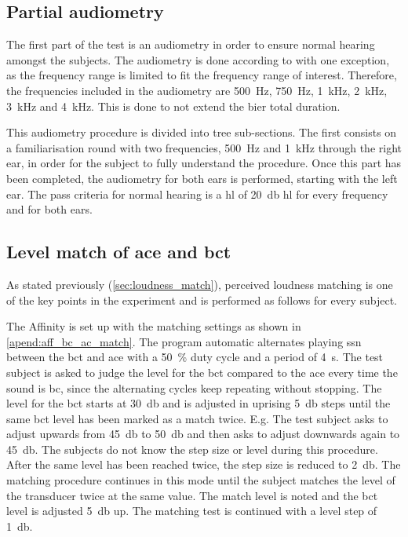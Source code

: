 \subsection{Partial audiometry}
The first part of the test is an audiometry in order to ensure normal hearing amongst the subjects. The audiometry is done according to \citep{iso_8253-2} with one exception, as the frequency range is limited to fit the frequency range of interest. Therefore, the frequencies included in the audiometry are \SI{500}{\hertz}, \SI{750}{\hertz}, \SI{1}{\kilo\hertz}, \SI{2}{\kilo\hertz}, \SI{3}{\kilo\hertz} and \SI{4}{\kilo\hertz}. This is done to not extend the \gls{bier} total duration.

This audiometry procedure is divided into tree sub-sections. The first consists on a familiarisation round with two frequencies, \SI{500}{\hertz} and \SI{1}{\kilo\hertz} through the right ear, in order for the subject to fully understand the procedure. Once this part has been completed, the audiometry for both ears is performed, starting with the left ear. The pass criteria for normal hearing is a \gls{hl} of \SI{20}{\decibel} \gls{hl} for every frequency and for both ears.
   
\subsection{Level match of \gls{ace} and \gls{bct}}\label{ssec:match}
As stated previously (\autoref{sec:loudness_match}), perceived loudness matching is one of the key points in the experiment and is performed as follows for every subject. 

The Affinity is set up with the matching settings as shown in \autoref{apend:aff_bc_ac_match}. The program automatic alternates playing \gls{ssn} between the \gls{bct} and \gls{ace} with a \SI{50}{\percent} duty cycle and a period of \SI{4}{\second}. The test subject is asked to judge the level for the \gls{bct} compared to the \gls{ace} every time the sound is \gls{bc}, since the alternating cycles keep repeating without stopping. The level for the \gls{bct} starts at \SI{30}{\decibel} and is adjusted in uprising \SI{5}{\decibel} steps until the same \gls{bct} level has been marked as a match twice. E.g. The test subject asks to adjust upwards from \SI{45}{\decibel} to \SI{50}{\decibel} and then asks to adjust downwards again to \SI{45}{\decibel}. The subjects do not know the step size or level during this procedure. 
After the same level has been reached twice, the step size is reduced to \SI{2}{\decibel}. The matching procedure continues in this mode until the subject matches the level of the transducer twice at the same value. The match level is noted and the  \gls{bct} level is adjusted \SI{5}{\decibel} up. The matching test is continued with a level step of \SI{1}{\decibel}.


